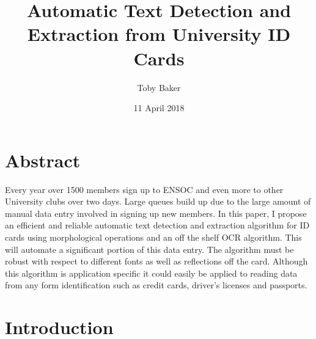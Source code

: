 \documentclass[12pt,a4paper,notitlepage]{IEEEtran}
\begin{document}
	\title{Automatic Text Detection and Extraction from University ID Cards}
	\author{Toby Baker}
	\date{11 April 2018}

	\maketitle

	\twocolumn
	\section{Abstract}

Every year over 1500 members sign up to ENSOC and even more to other University clubs over two days. Large queues build up due to the large amount of manual data entry involved in signing up new members. In this paper, I propose an efficient and reliable automatic text detection and extraction algorithm for ID cards using morphological operations and an off the shelf OCR algorithm. This will automate a significant portion of this data entry. The algorithm must be robust with respect to different fonts as well as reflections off the card. Although this algorithm is application specific it could easily be applied to reading data from any form identification such as credit cards, driver’s licenses and passports.

	\section{Introduction}
\end{document}
